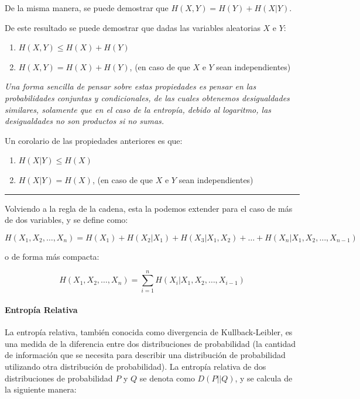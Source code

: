 De la misma manera, se puede demostrar que \(H(X,Y) = H(Y) + H(X|Y)\).

De este resultado se puede demostrar que dadas las variables aleatorias
\(X\) e \(Y\):

\begin{enumerate}
\def\labelenumi{\arabic{enumi}.}
\tightlist
\item
  \(H(X,Y) \leq H(X) + H(Y)\)
\item
  \(H(X,Y) = H(X) + H(Y)\), (en caso de que \(X\) e \(Y\) sean
  independientes)
\end{enumerate}

\emph{Una forma sencilla de pensar sobre estas propiedades es pensar en
las probabilidades conjuntas y condicionales, de las cuales obtenemos
desigualdades similares, solamente que en el caso de la entropía, debido
al logaritmo, las desigualdades no son productos si no sumas.}

Un corolario de las propiedades anteriores es que:

\begin{enumerate}
\def\labelenumi{\arabic{enumi}.}
\tightlist
\item
  \(H(X|Y) \leq H(X)\)
\item
  \(H(X|Y) = H(X)\), (en caso de que \(X\) e \(Y\) sean independientes)
\end{enumerate}

\begin{center}\rule{0.5\linewidth}{0.5pt}\end{center}

Volviendo a la regla de la cadena, esta la podemos extender para el caso
de más de dos variables, y se define como:

\[
H(X_1,X_2,\dots,X_n) = H(X_1) + H(X_2|X_1) + H(X_3|X_1,X_2) + \dots + H(X_n|X_1,X_2,\dots,X_{n-1})
\]

o de forma más compacta:

\[
H(X_1,X_2,\dots,X_n) = \sum_{i=1}^n H(X_i|X_1,X_2,\dots,X_{i-1})
\]

\paragraph{Entropía Relativa}\label{entropuxeda-relativa}

La entropía relativa, también conocida como divergencia de
Kullback-Leibler, es una medida de la diferencia entre dos
distribuciones de probabilidad (la cantidad de información que se
necesita para describir una distribución de probabilidad utilizando otra
distribución de probabilidad). La entropía relativa de dos
distribuciones de probabilidad \(P\) y \(Q\) se denota como \(D(P||Q)\),
y se calcula de la siguiente manera:

